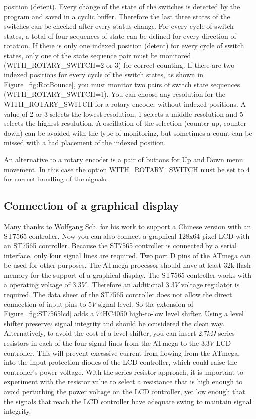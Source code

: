 position (detent). Every change of the state of the switches is detected by the program
and saved in a cyclic buffer. Therefore the last three states of the switches can be checked
after every status change.
For every cycle of switch states,
a total of four sequences of state can be defined for every direction of rotation.
If there is only one indexed position (detent) for every cycle of switch states, only
one of the state sequence pair must be monitored (WITH\_ROTARY\_SWITCH=2 or 3) for correct counting.
If there are two indexed positions for every cycle of the switch states, as shown in Figure~\ref{fig:RotBounce},
you must monitor two pairs of switch state sequences (WITH\_ROTARY\_SWITCH=1).
You can choose any resolution for the WITH\_ROTARY\_SWITCH for a rotary encoder without
indexed positions. A value of 2 or 3 selects the lowest resolution, 1 selects a middle resolution
and 5 selects the highest resulution.
A oscillation of the selection (counter up, counter down) can be avoided with the type of monitoring,
but sometimes a count can be missed with a bad placement of the indexed position.

An alternative to a rotary encoder is a pair of buttons for Up and Down menu movement.
In this case the option WITH\_ROTARY\_SWITCH must be set to 4 for correct handling of
the signals.

\subsection{Connection of a graphical display}

Many thanks to Wolfgang Sch. for his work to support a Chinese version with an ST7565 controller.
Now you can also connect a graphical 128x64 pixel LCD with an ST7565 controller.
Because the ST7565 controller is connected by a serial interface, only four signal
lines are required. Two port D pins of the ATmega can be used for other purposes.
The ATmega processor should have at least 32k flash memory for the support of a graphical display.
The ST7565 controller works with a operating voltage of \(3.3V\) .
Therefore an additional \(3.3V\) voltage regulator is required.
The data sheet of the ST7565 controller does not allow the direct connection of input pins to
\(5V\) signal level. So the extension of Figure~\ref{fig:ST7565lcd} adds a 74HC4050 
high-to-low level shifter. Using a level shifter preserves signal integrity and should be considered the clean way.
Alternatively, to avoid the cost of a level shifter, you can insert \(2.7k\Omega\) series resistors
in each of the four signal lines from the ATmega to the \(3.3V\) LCD controller.
This will prevent excessive current from flowing from the ATmega, into the input protection diodes of the
LCD controller, which could raise the controller's power voltage.
With the series resistor approach, it is important to experiment with the resistor value to select a resistance 
that is high enough to avoid perturbing the power voltage on the LCD controller, yet low enough that the signals
that reach the LCD controller have adequate swing to maintain signal integrity.

